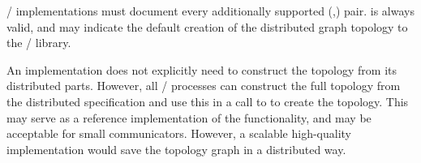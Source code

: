 \begin{implementors}
\MPI/ implementations must document every additionally supported (,)
 pair.  is always valid, and may
indicate the default creation of the distributed graph topology to the
\MPI/ library.

An implementation does not explicitly need to construct the topology
from its distributed parts. However, all \MPI/ processes can construct the
full topology from the distributed specification and use this in a
call to  to create the topology.  This may serve
as a reference implementation of the functionality, and may be
acceptable for small communicators. However, a scalable high-quality
implementation would save the topology graph in a distributed way.
\end{implementors}

